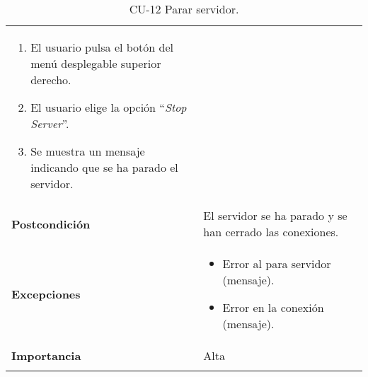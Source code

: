 \begin{longtable}[h!]{@{}ll@{}}
\begin{minipage}[t]{0.71\columnwidth}
\begin{enumerate}
\def\labelenumi{\arabic{enumi}.}
\tightlist
\item
  El usuario pulsa el botón del menú desplegable superior derecho.
\item
  El usuario elige la opción ``\textit{Stop Server}''.
\item
  Se muestra un mensaje indicando que se ha parado el servidor.
\end{enumerate}\strut
\end{minipage}\tabularnewline
\begin{minipage}[t]{0.23\columnwidth}\raggedright\strut
\textbf{Postcondición}\strut
\end{minipage} & \begin{minipage}[t]{0.71\columnwidth}\raggedright\strut
El servidor se ha parado y se han cerrado las conexiones.\strut
\end{minipage}\tabularnewline
\begin{minipage}[t]{0.23\columnwidth}\raggedright\strut
\textbf{Excepciones}\strut
\end{minipage} & \begin{minipage}[t]{0.71\columnwidth}\raggedright\strut
\begin{itemize}
\tightlist
\item
  Error al para servidor (mensaje).
\item
  Error en la conexión (mensaje).
\end{itemize}\strut
\end{minipage}\tabularnewline
\begin{minipage}[t]{0.23\columnwidth}\raggedright\strut
\textbf{Importancia}\strut
\end{minipage} & \begin{minipage}[t]{0.71\columnwidth}\raggedright\strut
Alta\strut
\end{minipage}\tabularnewline
\bottomrule
\caption{CU-12 Parar servidor.}
\end{longtable}